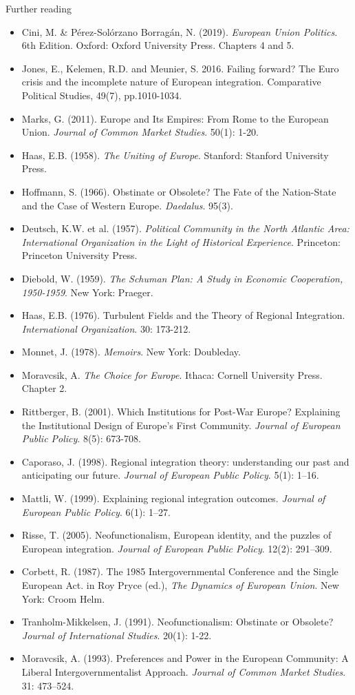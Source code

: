 \noindent Further reading

\begin{itemize}
	\item Cini, M. \& P\'{e}rez-Sol\'{o}rzano Borrag\'{a}n, N. (2019). \textit{European Union Politics}. 6th Edition. Oxford: Oxford University Press. Chapters 4 and 5.
	\item Jones, E., Kelemen, R.D. and Meunier, S. 2016. Failing forward? The Euro crisis and the incomplete nature of European integration. Comparative Political Studies, 49(7), pp.1010-1034.
	\item Marks, G. (2011). Europe and Its Empires: From Rome to the European Union. \textit{Journal of Common Market Studies}. 50(1): 1-20.
	\item Haas, E.B. (1958). \textit{The Uniting of Europe}. Stanford: Stanford University Press.
	\item Hoffmann, S. (1966). Obstinate or Obsolete? The Fate of the Nation-State and the Case of Western Europe. \textit{Daedalus}. 95(3).
	\item Deutsch, K.W. et al. (1957). \textit{Political Community in the North Atlantic Area: International Organization in the Light of Historical Experience}. Princeton: Princeton University Press.
	\item Diebold, W. (1959). \textit{The Schuman Plan: A Study in Economic Cooperation, 1950-1959}. New York: Praeger.
	\item Haas, E.B. (1976). Turbulent Fields and the Theory of Regional Integration. \textit{International Organization}. 30: 173-212.
	\item Monnet, J. (1978). \textit{Memoirs}. New York: Doubleday.
	\item Moravcsik, A. \textit{The Choice for Europe}. Ithaca: Cornell University Press. Chapter 2.
	\item Rittberger, B. (2001). Which Institutions for Post-War Europe? Explaining the Institutional Design of Europe’s First Community. \textit{Journal of European Public Policy}. 8(5): 673-708.
	\item Caporaso, J. (1998). Regional integration theory: understanding our past and anticipating our future. \textit{Journal of European Public Policy}. 5(1): 1–16.
	\item Mattli, W. (1999). Explaining regional integration outcomes. \textit{Journal of European Public Policy}. 6(1): 1–27.
	\item Risse, T. (2005). Neofunctionalism, European identity, and the puzzles of European integration. \textit{Journal of European Public Policy}. 12(2): 291–309.
	\item Corbett, R. (1987). The 1985 Intergovernmental Conference and the Single European Act. in Roy Pryce (ed.), \textit{The Dynamics of European Union}. New York: Croom Helm.
	\item Tranholm-Mikkelsen, J. (1991). Neofunctionalism: Obstinate or Obsolete? \textit{Journal of International Studies}. 20(1): 1-22.
	\item Moravcsik, A. (1993). Preferences and Power in the European Community: A Liberal Intergovernmentalist Approach. \textit{Journal of Common Market Studies}. 31: 473–524.
\end{itemize}


